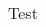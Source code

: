 \begin{table}[!ht]
\begin{adjustbox}{width=0.9\columnwidth,center}
\begin{tabular}{|c|c|l|}
\hline
\end{tabular}
\end{adjustbox}
\caption{Test}
\label{table:transfer_learning_strategy}
\end{table}